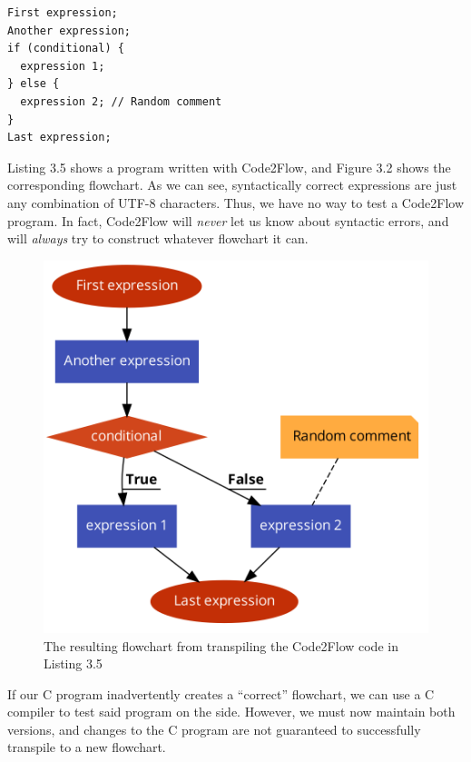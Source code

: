 \begin{lstlisting}[caption={A Code2Flow program}, captionpos=b]
First expression;
Another expression;
if (conditional) {
  expression 1;
} else {
  expression 2; // Random comment
}
Last expression;
\end{lstlisting}

Listing 3.5 shows a program written with Code2Flow, and Figure 3.2 shows the corresponding flowchart. As we can see, syntactically correct expressions are just any combination of UTF-8 characters. Thus, we have no way to test a Code2Flow program. In fact, Code2Flow will \textit{never} let us know about syntactic errors, and will \textit{always} try to construct whatever flowchart it can. \\

\begin{figure}[ht]
    \centering
    \includegraphics[scale=0.2]{assets/code2flow_example.png}
    \caption{The resulting flowchart from transpiling the Code2Flow code in Listing 3.5}
    \label{fig:code2flow}
\end{figure}

If our C program inadvertently creates a ``correct'' flowchart, we can use a C compiler to test said program on the side. However, we must now maintain both versions, and changes to the C program are not guaranteed to successfully transpile to a new flowchart.

